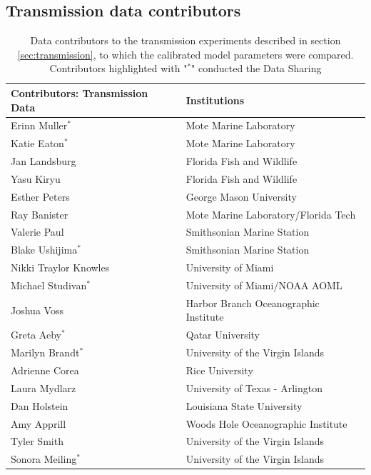 \documentclass[utf8]{frontiersSCNS}
\begin{document}
\subsection*{Transmission data contributors}
\begin{table}[h!]
    \center
    \begin{tabular}{|l|l|}
        \hline
        \textbf{Contributors: Transmission Data} & \textbf{Institutions} \\ \hline
        Erinn Muller$^\ast$     & Mote Marine Laboratory                 \\ \hline
        Katie Eaton$^\ast$      & Mote Marine Laboratory                 \\ \hline
        Jan Landsburg           & Florida Fish and Wildlife              \\ \hline
        Yasu Kiryu              & Florida Fish and Wildlife              \\ \hline
        Esther Peters           & George Mason University                \\ \hline
        Ray Banister            & Mote Marine Laboratory/Florida Tech    \\ \hline
        Valerie Paul            & Smithsonian Marine Station             \\ \hline
        Blake Ushijima$^\ast$   & Smithsonian Marine Station             \\ \hline
        Nikki Traylor Knowles   & University of Miami                    \\ \hline
        Michael Studivan$^\ast$ & University of Miami/NOAA AOML          \\ \hline
        Joshua Voss             & Harbor Branch Oceanographic Institute  \\ \hline
        Greta Aeby$^\ast$       & Qatar University                       \\ \hline
        Marilyn Brandt$^\ast$   & University of the Virgin Islands       \\ \hline
        Adrienne Corea          & Rice University                        \\ \hline
        Laura Mydlarz           & University of Texas - Arlington        \\ \hline
        Dan Holstein            & Louisiana State University             \\ \hline
        Amy Apprill             & Woods Hole Oceanographic Institute     \\ \hline
        Tyler Smith             & University of the Virgin Islands       \\ \hline
        Sonora Meiling$^\ast$   & University of the Virgin Islands       \\ \hline
    \end{tabular}
    \caption{Data contributors to the transmission experiments described in section \ref{sec:transmission}, to which the calibrated model parameters were compared. Contributors highlighted with "$^\ast$" conducted the Data Sharing}
    \label{tab:contributors}
\end{table}
\end{document}
